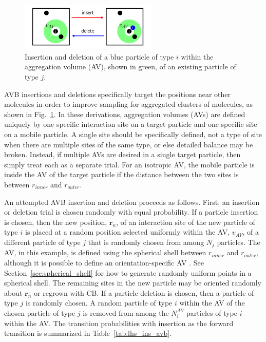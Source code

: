\documentclass[
  9pt,
  bestpractices,
]{livecoms}
\begin{document}
\begin{figure}
\begin{centering}
\includegraphics[width=6.5cm]{../figures/avb.pdf}
\caption{
Insertion and deletion of a blue particle of type $i$ within the aggregation volume (AV), shown in green, of an existing particle of type $j$.
}
\label{fig:avb_gce}
\end{centering}
\end{figure}

AVB insertions and deletions specifically target the positions near other molecules \cite{chen_improving_2001} in order to improve sampling for aggregated clusters of molecules, as shown in Fig.~\ref{fig:avb_gce}.
In these derivations, aggregation volumes (AVs) are defined uniquely by one specific interaction site on a target particle and one specific site on a mobile particle.
A single site should be specifically defined, not a type of site when there are multiple sites of the same type, or else detailed balance may be broken.
Instead, if multiple AVs are desired in a single target particle, then simply treat each as a separate trial.
For an isotropic AV, the mobile particle is inside the AV of the target particle if the distance between the two sites is between $r_{inner}$ and $r_{outer}$.

An attempted AVB insertion and deletion proceeds as follows.
First, an insertion or deletion trial is chosen randomly with equal probability.
If a particle insertion is chosen, then the new position, $\mathbf{r}_n$, of an interaction site of the new particle of type $i$ is placed at a random position selected uniformly within the AV, $v_{AV}$, of a different particle of type $j$ that is randomly chosen from among $N_j$ particles.
The AV, in this example, is defined using the spherical shell between $r_{inner}$ and $r_{outer}$, although it is possible to define an orientation-specific AV \cite{rovigatti_how_2018}.
See Section~\ref{sec:spherical_shell} for how to generate randomly uniform points in a spherical shell.
The remaining sites in the new particle may be oriented randomly about $\mathbf{r}_n$ or regrown with CB.
If a particle deletion is chosen, then a particle of type $j$ is randomly chosen.
A random particle of type $i$ within the AV of the chosen particle of type $j$ is removed from among the $N_i^{AV}$ particles of type $i$ within the AV.
The transition probabilities with insertion as the forward transition is summarized in Table~\ref{tab:lhs_ins_avb}.
\end{document}
